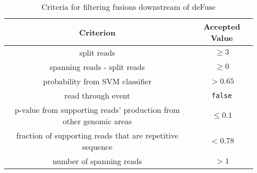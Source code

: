 \begin{description}
\begin{table} 
	\begin{center}
          \begin{tabular}{|c|c|} \hline
            \textbf{Criterion} & \textbf{Accepted Value} \\ \hline
            split reads & $\geq 3$ \\
            spanning reads - split reads & $\geq 0$\\
            probability from SVM classifier & $ > 0.65$\\
            read through event & \texttt{false}\\
            p-value from supporting reads' production from other
            genomic areas & $\leq 0.1$ \\
            fraction of supporting reads that are repetitive sequence
                               & $< 0.78$\\
            number of spanning reads & $> 1$ \\ \hline
          \end{tabular}
           \end{center}          
          \caption{Criteria for filtering fusions downstream of
                   deFuse} \label{filtering}
               \end{table}               


\end{description}
































